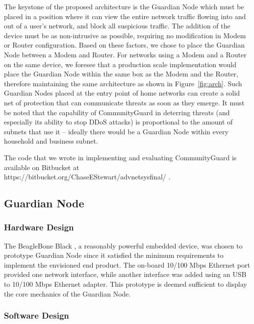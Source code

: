 The keystone of the proposed architecture is the Guardian Node which must be placed in a position where it can view the entire network traffic flowing into and out of a user's network, and block all suspicious traffic. The addition of the device must be as non-intrusive as possible, requiring no modification in Modem or Router configuration.
Based on these factors, we chose to place the Guardian Node between a Modem and Router. For networks using a Modem and a Router on the same device, we foresee that a production scale implementation would place the Guardian Node within the same box as the Modem and the Router, therefore maintaining the same architecture as shown in Figure~\ref{fig:arch}. Such Guardian Nodes placed at the entry point of home networks can create a solid net of protection that can communicate threats as soon as they emerge. It must be noted that the capability of CommunityGuard in deterring threats (and especially its ability to stop DDoS attacks) is proportional to the amount of subnets that use it -- ideally there would be a Guardian Node within every household and business subnet.

The code that we wrote in implementing and evaluating CommunityGuard is available on Bitbucket at \\ https://bitbucket.org/ChaseEStewart/advnetsysfinal/ \cite{us}.

\subsection{Guardian Node}
\label{sec:design:guardian}

\subsubsection{Hardware Design}
\label{sec:design:hardware}
The BeagleBone Black \cite{board} , a reasonably powerful embedded device, was chosen to prototype Guardian Node since it satisfied the minimum requirements to implement the envisioned end product. The on-board 10/100 Mbps Ethernet port provided one network interface, while another interface was added using an USB to 10/100 Mbps Ethernet adapter. This prototype is deemed sufficient to display the core mechanics of the Guardian Node. 

\subsubsection{Software Design}
\label{sec:design:software}

